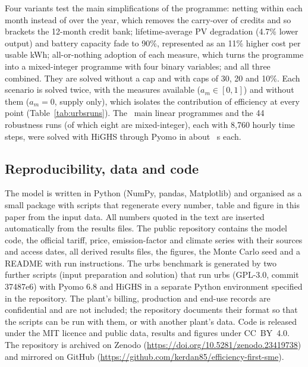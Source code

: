 \documentclass[processes,article,submit,pdftex,moreauthors]{Definitions/mdpi}
\begin{document}
Four variants test the main simplifications of the programme: netting within each month instead of over the year, which removes the carry-over of credits and so brackets the 12-month credit bank; lifetime-average PV degradation (4.7\% lower output) and battery capacity fade to 90\%, represented as an 11\% higher cost per usable kWh; all-or-nothing adoption of each measure, which turns the programme into a mixed-integer programme with four binary variables; and all three combined. They are solved without a cap and with caps of 30, 20 and 10\%. Each scenario is solved twice, with the measures available ($a_m \in [0,1]$) and without them ($a_m = 0$, supply only), which isolates the contribution of efficiency at every point (Table~\ref{tab:urbsruns}). The \nUNRuns\ main linear programmes and the 44 robustness runs (of which eight are mixed-integer), each with 8,760 hourly time steps, were solved with HiGHS through Pyomo in about \nUSolveMean~s each.

\subsection{Reproducibility, data and code}
\label{sec:repro}
The model is written in Python (NumPy, pandas, Matplotlib) and organised as a small package with scripts that regenerate every number, table and figure in this paper from the input data. All numbers quoted in the text are inserted automatically from the results files. The public repository contains the model code, the official tariff, price, emission-factor and climate series with their sources and access dates, all derived results files, the figures, the Monte Carlo seed and a README with run instructions. The urbs benchmark is generated by two further scripts (input preparation and solution) that run urbs (GPL-3.0, commit 37487e6) with Pyomo 6.8 and HiGHS in a separate Python environment specified in the repository. The plant's billing, production and end-use records are confidential and are not included; the repository documents their format so that the scripts can be run with them, or with another plant's data. Code is released under the MIT licence and public data, results and figures under CC~BY~4.0. The repository is archived on Zenodo (\url{https://doi.org/10.5281/zenodo.23419738}) and mirrored on GitHub (\url{https://github.com/kerdan85/efficiency-first-sme}).
\end{document}
